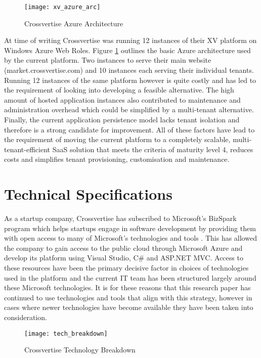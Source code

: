 \begin{figure}
\centering
\texttt{[image: xv\_azure\_arc]}
\caption{Crossvertise Azure Architecture}
\label{fig:xv_azure_arc}
\end{figure}


At time of writing Crossvertise was running 12 instances of their XV platform on Windows Azure Web Roles. Figure \ref{fig:xv_azure_arc} outlines the basic Azure architecture used by the current platform. Two instances to serve their main website (market.crossvertise.com) and 10 instances each serving their individual tenants. Running 12 instances of the same platform however is quite costly and has led to the requirement of looking into developing a feasible alternative. The high amount of hosted application instances also contributed to maintenance and administration overhead which could be simplified by a multi-tenant alternative. Finally, the current application persistence model lacks tenant isolation and therefore is a strong candidate for improvement. All of these factors have lead to the requirement of moving the current platform to a completely scalable, multi-tenant-efficient SaaS solution that meets the criteria of maturity level 4, reduces costs and simplifies tenant provisioning, customisation and maintenance. 

\section{Technical Specifications}
As a startup company, Crossvertise has subscribed to Microsoft's BizSpark program which helps startups engage in software development by providing them with open access to many of Microsoft's technologies and tools \cite{BizSpark}. This has allowed the company to gain access to the public cloud through Microsoft Azure and develop its platform using Visual Studio, C\# and ASP.NET MVC. Access to these resources have been the primary decisive factor in choices of technologies used in the platform and the current IT team has been structured largely around these Microsoft technologies. It is for these reasons that this research paper has continued to use technologies and tools that align with this strategy, however in cases where newer technologies have become available they have been taken into consideration. 

\begin{figure}
\centering
\texttt{[image: tech\_breakdown]}
\caption{Crossvertise Technology Breakdown}
\label{fig:xv_tech_breakdown}
\end{figure}

